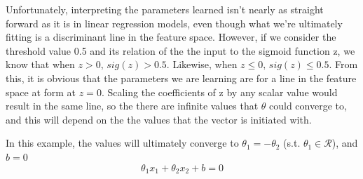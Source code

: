 \documentclass[11pt,largemargins]{homework}
\begin{document}
Unfortunately, interpreting the parameters learned isn't nearly as straight forward as it is in linear regression models, even though what we're ultimately fitting is a discriminant line in the feature space. However, if we consider the threshold value 0.5 and its relation of the the input to the sigmoid function z, we know that when $z > 0,\,sig(z) > 0.5$. Likewise, when $z\leq 0, \, sig(z) \leq 0.5$. From this, it is obvious that the parameters we are learning are for a line in the feature space at form at $z=0$. Scaling the coefficients of z by any scalar value would result in the same line, so the there are infinite values that $\theta$ could converge to, and this will depend on the the values that the vector is initiated with.


In this example, the values will ultimately converge to $\theta_1=-\theta_2$ (s.t. $\theta_1\in\mathcal{R}$), and $b=0$
$$\theta_1x_1+\theta_2x_2+b=0$$
\end{document}

